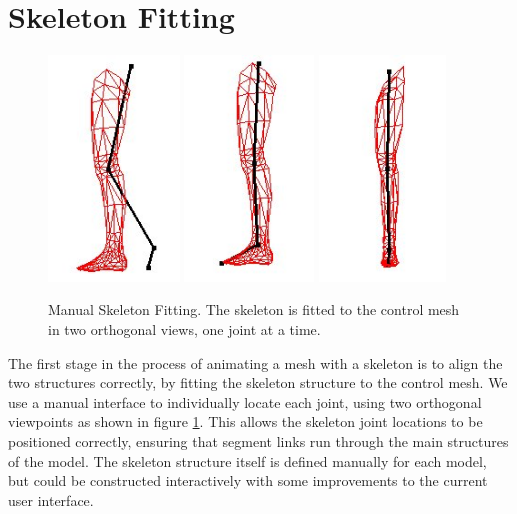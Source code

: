 \section{\label{sec:skeletalanim:fitting}Skeleton Fitting}
\begin{figure}
\begin{center}
\includegraphics[height=6cm]{../images/fit1}
\includegraphics[height=6cm]{../images/fit2}
\includegraphics[height=6cm]{../images/fit3}
\caption[Manual Skeleton Fitting]{\label{fig:skeletonfitting} Manual Skeleton Fitting. The skeleton is fitted to the control mesh in two orthogonal views, one joint at a time.}
\end{center}
\end{figure}
The first stage in the process of animating a mesh with a skeleton is to align the two structures correctly, by fitting the skeleton structure to the control mesh. We use a manual interface to individually locate each joint, using two orthogonal viewpoints as shown in figure \ref{fig:skeletonfitting}. This allows the skeleton joint locations to be positioned correctly, ensuring that segment links run through the main structures of the model. The skeleton structure itself is defined manually for each model, but could be constructed interactively with some improvements to the current user interface.

